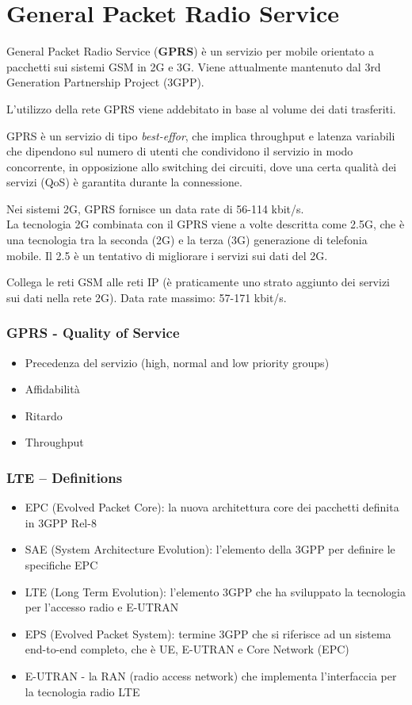 \section{General Packet Radio Service}
\label{sec:gprs}

General Packet Radio Service (\textbf{GPRS}) è un servizio per mobile orientato 
a pacchetti sui sistemi GSM in 2G e 3G. Viene attualmente mantenuto dal 3rd 
Generation Partnership Project (3GPP).

L'utilizzo della rete GPRS viene addebitato in base al volume dei dati 
trasferiti.

GPRS è un servizio di tipo \textit{best-effor}, che implica throughput e 
latenza variabili che dipendono sul numero di utenti che condividono il
servizio in modo concorrente, in opposizione allo switching dei circuiti,
dove una certa qualità dei servizi (QoS) è garantita durante la connessione.

Nei sistemi 2G, GPRS fornisce un data rate di 56-114 kbit/s.\\

La tecnologia 2G combinata con il GPRS viene a volte descritta come 2.5G,
che è una tecnologia tra la seconda (2G) e la terza (3G) generazione di 
telefonia mobile. Il 2.5 è un tentativo di migliorare i servizi sui dati 
del 2G.

Collega le reti GSM alle reti IP (è praticamente uno strato aggiunto dei 
servizi sui dati nella rete 2G). Data rate massimo: 57-171 kbit/s.

\subsubsection{GPRS - Quality of Service}
\begin{itemize}
  \item Precedenza del servizio (high, normal and low priority groups)
  \item Affidabilità
  \item Ritardo
  \item Throughput
\end{itemize}

\subsubsection{LTE – Definitions}

\begin{itemize}
  \item EPC (Evolved Packet Core): la nuova architettura core dei pacchetti 
  definita in 3GPP Rel-8
  \item SAE (System Architecture Evolution): l'elemento della 3GPP per
definire le specifiche EPC
  \item LTE (Long Term Evolution): l'elemento 3GPP che ha sviluppato la tecnologia
  per l'accesso radio e E-UTRAN
  \item EPS (Evolved Packet System): termine 3GPP che si riferisce ad un sistema 
  end-to-end completo, che è UE, E-UTRAN e Core Network (EPC)
  \item E-UTRAN - la RAN (radio access network) che implementa l'interfaccia per la 
  tecnologia radio LTE
\end{itemize}

